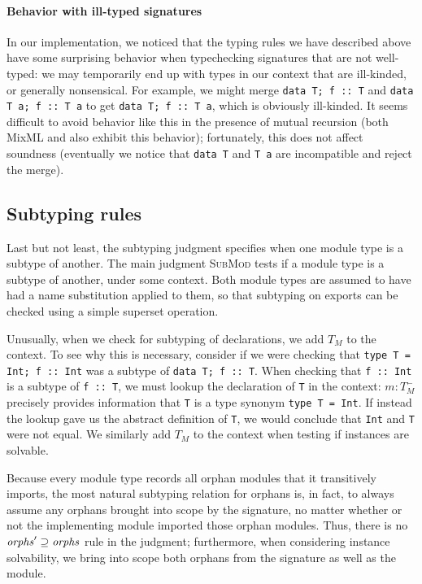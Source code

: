 \paragraph{Behavior with ill-typed signatures}  In our implementation,
we noticed that the typing rules we have
described above have some surprising behavior when typechecking signatures that
are not well-typed: we may temporarily end up with types in our context
that are ill-kinded, or generally nonsensical.  For example, we might
merge \verb|data T; f :: T| and \verb|data T a; f :: T a| to get
\verb|data T; f :: T a|, which is obviously ill-kinded.  It seems difficult
to avoid behavior like this in the presence of mutual recursion (both MixML
and \OldBackpack{} also exhibit this behavior); fortunately,
this does not affect soundness (eventually we notice that \verb|data T|
and \verb|T a| are incompatible and reject the merge).

\subsection{Subtyping rules}




Last but not least, the subtyping judgment specifies when one module type
is a subtype of another.  The main judgment \textsc{SubMod} tests if
a module type is a subtype of another, under some context.  Both module
types are assumed to have had a name substitution applied to them, so that
subtyping on exports can be checked using a simple superset operation.

Unusually, when we check for subtyping of declarations, we add $T_M$
to the context.  To see why this is necessary, consider if we were
checking that \verb|type T = Int; f :: Int| was a subtype of \verb|data T; f :: T|.
When checking that \verb|f :: Int| is a subtype of \verb|f :: T|, we must lookup
the declaration of \verb|T| in the context: $m : T_M^-$ precisely provides
information that \verb|T| is a type synonym \verb|type T = Int|.  If
instead the lookup gave us the abstract definition of \verb|T|, we would conclude
that \verb|Int| and \verb|T| were not equal.  We similarly add $T_M$ to
the context when testing if instances are solvable.

Because every module type records all orphan modules that it transitively
imports, the most natural subtyping relation for orphans is, in fact, to
always assume any orphans brought into scope by the signature, no matter
whether or not the implementing module imported those orphan modules. Thus,
there is no $\mathit{orphs}' \supseteq \mathit{orphs}$ rule in the judgment; furthermore, when
considering instance solvability, we bring into scope both orphans from the
signature as well as the module.

